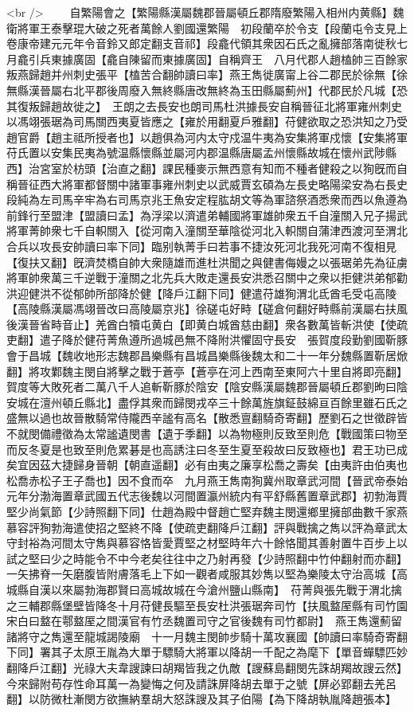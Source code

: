 <br />
　　自繁陽會之【繁陽縣漢屬魏郡晉屬頓丘郡隋廢繁陽入相州内黄縣】魏衛將軍王泰擊琨大破之死者萬餘人劉國還繁陽　初段蘭卒於令支【段蘭屯令支見上卷康帝建元元年令音鈴又郎定翻支音祁】段龕代領其衆因石氏之亂擁部落南徙秋七月龕引兵東據廣固【龕自陳留而東據廣固】自稱齊王　八月代郡人趙榼帥三百餘家叛燕歸趙并州刺史張平【榼苦合翻帥讀曰率】燕王雋徙廣甯上谷二郡民於徐無【徐無縣漢晉屬右北平郡後周廢入無終縣唐改無終為玉田縣屬薊州】代郡民於凡城【恐其復叛歸趙故徙之】　王朗之去長安也朗司馬杜洪據長安自稱晉征北將軍雍州刺史以馮翊張琚為司馬關西夷夏皆應之【雍於用翻夏戶雅翻】苻健欲取之恐洪知之乃受趙官爵【趙主祗所授者也】以趙俱為河内太守戍温牛夷為安集將軍戍懷【安集將軍苻氏置以安集民夷為號温縣懷縣並屬河内郡温縣唐屬孟州懷縣故城在懷州武陟縣西】治宮室於枋頭【治直之翻】課民種麥示無西意有知而不種者健殺之以狥旣而自稱晉征西大將軍都督關中諸軍事雍州刺史以武威賈玄碩為左長史略陽梁安為右長史段純為左司馬辛牢為右司馬京兆王魚安定程肱胡文等為軍諮祭酒悉衆而西以魚遵為前鋒行至盟津【盟讀曰孟】為浮梁以濟遣弟輔國將軍雄帥衆五千自潼關入兄子揚武將軍菁帥衆七千自軹關入【從河南入潼關至華陰從河北入軹關自蒲津西渡河至渭北合兵以攻長安帥讀曰率下同】臨别執菁手曰若事不捷汝死河北我死河南不復相見【復扶又翻】旣濟焚橋自帥大衆隨雄而進杜洪聞之與健書侮嫚之以張琚弟先為征虜將軍帥衆萬三千逆戰于潼關之北先兵大敗走還長安洪悉召關中之衆以拒健洪弟郁勸洪迎健洪不從郁帥所部降於健【降戶江翻下同】健遣苻雄狥渭北氐酋毛受屯高陵【高陵縣漢屬馮翊晉改曰高陵屬京兆】徐磋屯好畤【磋倉何翻好畤縣前漢屬右扶風後漢晉省畤音止】羌酋白犢屯黄白【即黄白城酋慈由翻】衆各數萬皆斬洪使【使疏吏翻】遣子降於健苻菁魚遵所過城邑無不降附洪懼固守長安　張賀度段勤劉國靳豚會于昌城【魏收地形志魏郡昌樂縣有昌城昌樂縣後魏太和二十一年分魏縣置靳居焮翻】將攻鄴魏主閔自將擊之戰于蒼亭【蒼亭在河上西南至東阿六十里自將即亮翻】賀度等大敗死者二萬八千人追斬靳豚於陰安【陰安縣漢屬魏郡晉屬頓丘郡劉昫曰陰安城在澶州頓丘縣北】盡俘其衆而歸閔戎卒三十餘萬旌旗鉦鼓綿亘百餘里雖石氏之盛無以過也故晉散騎常侍隴西辛謐有高名【散悉亶翻騎奇寄翻】歷劉石之世徵辟皆不就閔備禮徵為太常謐遺閔書【遺于季翻】以為物極則反致至則危【戰國策曰物至而反冬夏是也致至則危累碁是也高誘注曰冬至生夏至殺故曰反致極也】君王功已成矣宜因茲大捷歸身晉朝【朝直遥翻】必有由夷之廉享松喬之壽矣【由夷許由伯夷也松喬赤松子王子喬也】因不食而卒　九月燕王雋南狥冀州取章武河間【晉武帝泰始元年分渤海置章武國五代志後魏以河間置瀛州統内有平舒縣舊置章武郡】初勃海賈堅少尚氣節【少詩照翻下同】仕趙為殿中督趙亡堅弃魏主閔還鄉里擁部曲數千家燕慕容評狥勃海遣使招之堅終不降【使疏吏翻降戶江翻】評與戰擒之雋以評為章武太守封裕為河間太守雋與慕容恪皆愛賈堅之材堅時年六十餘恪聞其善射置牛百步上以試之堅曰少之時能令不中今老矣往往中之乃射再發【少詩照翻中竹仲翻射而亦翻】一矢拂脊一矢磨腹皆附膚落毛上下如一觀者咸服其妙雋以堅為樂陵太守治高城【高城縣自漢以來屬勃海郡賢曰高城故城在今滄州鹽山縣南】　苻菁與張先戰于渭北擒之三輔郡縣堡壁皆降冬十月苻健長驅至長安杜洪張琚奔司竹【扶風盩厔縣有司竹園宋白曰盩在鄠盩厔之間漢官有竹丞魏置司守之官後魏有司竹都尉】　燕王雋還薊留諸將守之雋還至龍城謁陵廟　十一月魏主閔帥步騎十萬攻襄國【帥讀曰率騎奇寄翻下同】署其子太原王胤為大單于驃騎大將軍以降胡一千配之為麾下【單音蟬驃匹妙翻降戶江翻】光祿大夫韋謏諫曰胡羯皆我之仇敵【謏蘇島翻閔先誅胡羯故謏云然】今來歸附苟存性命耳萬一為變悔之何及請誅屏降胡去單于之號【屏必郢翻去羌呂翻】以防微杜漸閔方欲撫納羣胡大怒誅謏及其子伯陽【為下降胡執胤降趙張本】　